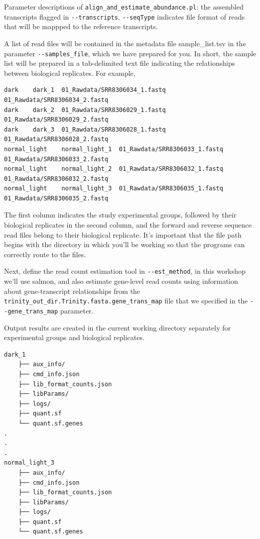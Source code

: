 \documentclass[
  letterpaper,
  DIV=11,
  numbers=noendperiod]{scrreprt}
\begin{document}
Parameter descriptions of \texttt{align\_and\_estimate\_abundance.pl}:
the assembled transcripts flagged in \texttt{-\/-transcripts},
\texttt{-\/-seqType} indicates file format of reads that will be mappped
to the reference transcripts.

A list of read files will be contained in the metadata file
sample\_list.tsv in the parameter \texttt{-\/-samples\_file}, which we
have prepared for you. In short, the sample list will be prepared in a
tab-delimited text file indicating the relationships between biological
replicates. For example,

\begin{verbatim}
dark    dark_1  01_Rawdata/SRR8306034_1.fastq   01_Rawdata/SRR8306034_2.fastq
dark    dark_2  01_Rawdata/SRR8306029_1.fastq   01_Rawdata/SRR8306029_2.fastq
dark    dark_3  01_Rawdata/SRR8306028_1.fastq   01_Rawdata/SRR8306028_2.fastq
normal_light    normal_light_1  01_Rawdata/SRR8306033_1.fastq   01_Rawdata/SRR8306033_2.fastq
normal_light    normal_light_2  01_Rawdata/SRR8306032_1.fastq   01_Rawdata/SRR8306032_2.fastq
normal_light    normal_light_3  01_Rawdata/SRR8306035_1.fastq   01_Rawdata/SRR8306035_2.fastq
\end{verbatim}

The first column indicates the study experimental groups, followed by
their biological replicates in the second column, and the forward and
reverse sequence read files belong to their biological replicate. It's
important that the file path begins with the directory in which you'll
be working so that the programs can correctly route to the files.

Next, define the read count estimation tool in \texttt{-\/-est\_method},
in this workshop we'll use salmon, and also estimate gene-level read
counts using information about gene-transcript relationships from the
\texttt{trinity\_out\_dir.Trinity.fasta.gene\_trans\_map} file that we
specified in the \texttt{-\/-gene\_trans\_map} parameter.

Output results are created in the current working directory separately
for experimental groups and biological replicates.

\begin{verbatim}
dark_1
    ├── aux_info/
    ├── cmd_info.json
    ├── lib_format_counts.json
    ├── libParams/
    ├── logs/
    ├── quant.sf
    └── quant.sf.genes
.
.
.
normal_light_3
    ├── aux_info/
    ├── cmd_info.json
    ├── lib_format_counts.json
    ├── libParams/
    ├── logs/
    ├── quant.sf
    └── quant.sf.genes
\end{verbatim}
\end{document}
